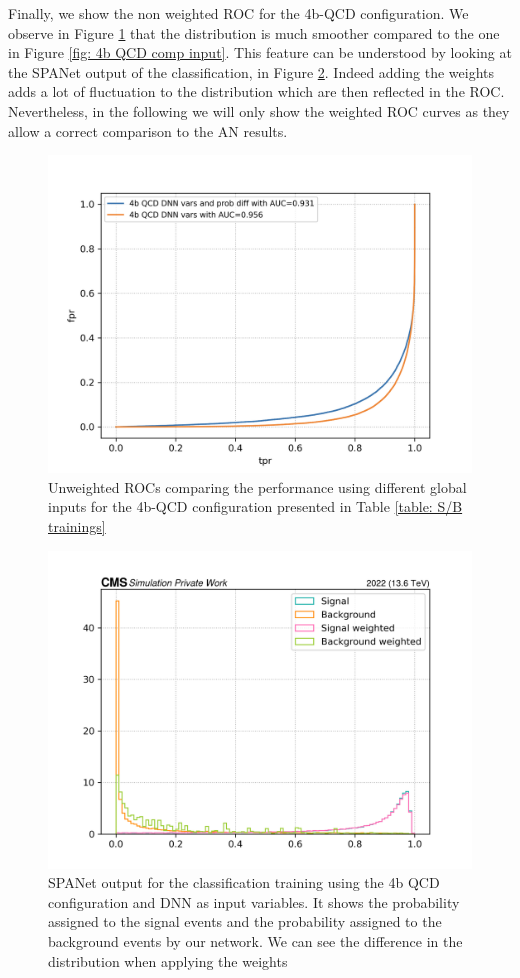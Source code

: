Finally, we show the non weighted ROC for the 4b-QCD configuration. We observe in Figure \ref{fig: 4b QCD ROC no weights} that the distribution is much smoother compared to the one in Figure \ref{fig: 4b QCD comp input}. This feature can be understood by looking at the SPANet output of the classification, in Figure \ref{fig: SPANet output S/B 4b QCD}. Indeed adding the weights adds a lot of fluctuation to the distribution which are then reflected in the ROC. Nevertheless, in the following we will only show the weighted ROC curves as they allow a correct comparison to the AN results.

\begin{figure}[hbt]
    \centering
    \includegraphics[width=0.7\linewidth]{Images/7.S_B/Inputs/no weights 4b QCD.png}
    \caption{Unweighted ROCs comparing the performance using different global inputs for the 4b-QCD configuration presented in Table \ref{table: S/B trainings}}
    \label{fig: 4b QCD ROC no weights}
\end{figure}

\begin{figure}
    \centering
    \includegraphics[width=0.7\linewidth]{Images/7.S:B/Classification outputs/4b QCD dnn.png}
    \caption{SPANet output for the classification training using the 4b QCD configuration and DNN as input variables. It shows the probability assigned to the signal events and the probability assigned to the background events by our network. We can see the difference in the distribution when applying the weights}
    \label{fig: SPANet output S/B 4b QCD}
\end{figure}

